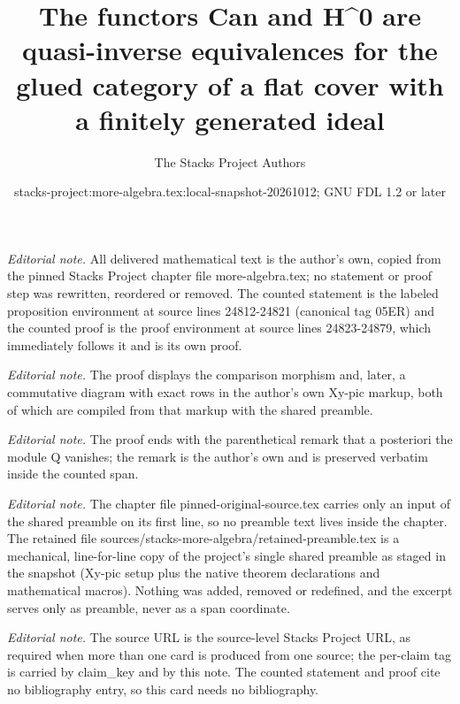 \documentclass[10pt,a4paper]{amsart}
\title{The functors Can and H\textasciicircum{}0 are quasi-inverse equivalences for the glued category of a flat cover with a finitely generated ideal}
\author{The Stacks Project Authors}
\date{stacks-project:more-algebra.tex:local-snapshot-20261012; GNU FDL 1.2 or later}
\theoremstyle{plain}
\theoremstyle{definition}
\theoremstyle{remark}
\numberwithin{equation}{subsection}
\begin{document}
\maketitle
\setcounter{subsection}{1}
\noindent\textit{Editorial note.} All delivered mathematical text is the author's own, copied from the pinned Stacks Project chapter file more-algebra.tex; no statement or proof step was rewritten, reordered or removed. The counted statement is the labeled proposition environment at source lines 24812-24821 (canonical tag 05ER) and the counted proof is the proof environment at source lines 24823-24879, which immediately follows it and is its own proof.\par\medskip
\noindent\textit{Editorial note.} The proof displays the comparison morphism and, later, a commutative diagram with exact rows in the author's own Xy-pic markup, both of which are compiled from that markup with the shared preamble.\par\medskip
\noindent\textit{Editorial note.} The proof ends with the parenthetical remark that a posteriori the module Q vanishes; the remark is the author's own and is preserved verbatim inside the counted span.\par\medskip
\noindent\textit{Editorial note.} The chapter file pinned-original-source.tex carries only an input of the shared preamble on its first line, so no preamble text lives inside the chapter. The retained file sources/stacks-more-algebra/retained-preamble.tex is a mechanical, line-for-line copy of the project's single shared preamble as staged in the snapshot (Xy-pic setup plus the native theorem declarations and mathematical macros). Nothing was added, removed or redefined, and the excerpt serves only as preamble, never as a span coordinate.\par\medskip
\noindent\textit{Editorial note.} The source URL is the source-level Stacks Project URL, as required when more than one card is produced from one source; the per-claim tag is carried by claim\_key and by this note. The counted statement and proof cite no bibliography entry, so this card needs no bibliography.\par\medskip
\end{document}

